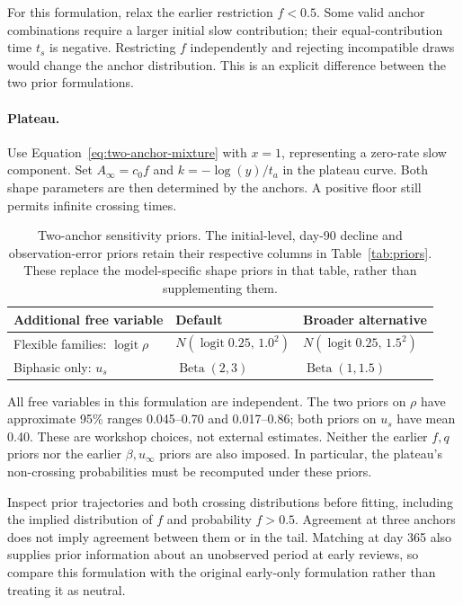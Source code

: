 \documentclass[11pt,a4paper]{article}
\begin{document}
For this formulation, relax the earlier restriction $f<0.5$. Some valid
anchor combinations require a larger initial slow contribution; their
equal-contribution time $t_s$ is negative. Restricting $f$ independently
and rejecting incompatible draws would change the anchor distribution.
This is an explicit difference between the two prior formulations.

\paragraph{Plateau.}
Use Equation~\ref{eq:two-anchor-mixture} with $x=1$, representing a
zero-rate slow component. Set $A_\infty=c_0f$ and $k=-\log(y)/t_a$ in
the plateau curve. Both shape parameters are then determined by the
anchors. A positive floor still permits infinite crossing times.

\begin{table}[H]
\centering
\small
\caption{Two-anchor sensitivity priors. The initial-level, day-90 decline
and observation-error priors retain their respective columns in
Table~\ref{tab:priors}. These replace the model-specific shape priors
in that table, rather than supplementing them.}
\label{tab:two-anchor-priors}
\begin{tabularx}{\textwidth}{@{}lXX@{}}
\toprule
Additional free variable & Default & Broader alternative \\
\midrule
Flexible families: $\operatorname{logit}\rho$
  & $N(\operatorname{logit}0.25,\,1.0^2)$
  & $N(\operatorname{logit}0.25,\,1.5^2)$ \\
Biphasic only: $u_s$ & $\operatorname{Beta}(2,3)$
  & $\operatorname{Beta}(1,1.5)$ \\
\bottomrule
\end{tabularx}
\end{table}

All free variables in this formulation are independent. The two priors on
$\rho$ have approximate 95\% ranges 0.045--0.70 and 0.017--0.86;
both priors on $u_s$ have mean 0.40. These are workshop choices, not
external estimates. Neither the earlier $f,q$ priors nor the earlier
$\beta,u_\infty$ priors are also imposed. In particular, the plateau's
non-crossing probabilities must be recomputed under these priors.

Inspect prior trajectories and both crossing distributions before fitting,
including the implied distribution of $f$ and probability $f>0.5$.
Agreement at three anchors does not imply agreement between them or in
the tail. Matching at day 365 also supplies prior information about an
unobserved period at early reviews, so compare this formulation with the
original early-only formulation rather than treating it as neutral.
\end{document}

